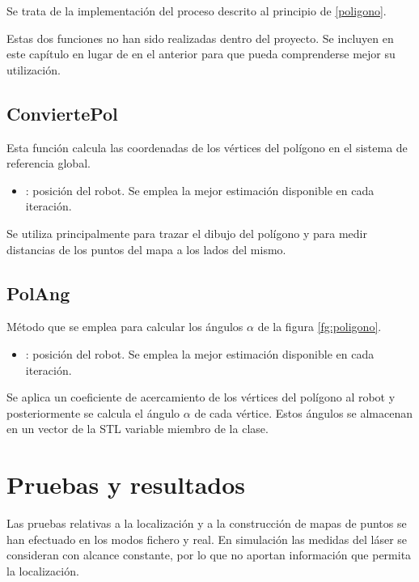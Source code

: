 Se trata de la implementación del proceso descrito al principio de \ref{poligono}.

\vspace{0.2cm}
\noindent
Estas dos funciones no han sido realizadas dentro del proyecto. Se incluyen en este capítulo en lugar de en el anterior para que pueda comprenderse mejor su utilización.

\subsection{ConviertePol}


Esta función calcula las coordenadas de los vértices del polígono en el sistema de referencia global.

\begin{itemize}
  \item {}: posición del robot. Se emplea la mejor estimación disponible en cada iteración.
\end{itemize}

Se utiliza principalmente para trazar el dibujo del polígono y para medir distancias de los puntos del mapa a los lados del mismo.
\subsection{PolAng}

\noindent
{}

Método que se emplea para calcular los ángulos $\alpha$ de la figura \ref{fg:poligono}.

\begin{itemize}
  \item {}: posición del robot. Se emplea la mejor estimación disponible en cada iteración.
\end{itemize}

Se aplica un coeficiente de acercamiento de los vértices del polígono al robot y posteriormente se calcula el ángulo $\alpha$ de cada vértice. Estos ángulos se almacenan en un vector  de la STL variable miembro de la clase.

\section{Pruebas y resultados}
Las pruebas relativas a la localización y a la construcción de mapas de puntos se han efectuado en los modos fichero y real. En simulación las medidas del láser se consideran con alcance constante, por lo que no aportan información que permita la localización.


